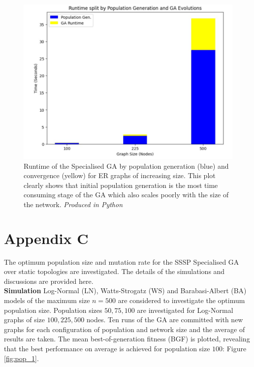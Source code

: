 \documentclass[
	a4paper, %
	10pt, %
	unnumberedsections, %
	twoside, %
]{LTJournalArticle}
\begin{document}
\begin{figure}[H]
	\includegraphics[width=\linewidth]{Figures/sssp/runtime.jpg}
	\caption{Runtime of the Specialised GA by population generation (blue) and convergence (yellow) for ER graphs of increasing size. This plot clearly shows that initial population generation is the most time consuming stage of the GA which also scales poorly with the size of the network. \emph{Produced in Python}}
	\label{fig:sssp_runtime}
\end{figure}

\chapter{Appendix C}
The optimum population size and mutation rate for the SSSP Specialised GA over static topologies are investigated. The details of the simulations and discussions are provided here. \\
 
 \textbf{Simulation} Log-Normal (LN), Watts-Strogatz (WS) and Barabasi-Albert (BA) models of the maximum size \(n = 500\) are considered to investigate the optimum population size. 
Population sizes \(50, 75, 100\) are investigated for Log-Normal graphs of size \(100, 225, 500\) nodes. Ten runs of the GA are committed with new graphs for each configuration of population and network size and the average of results are taken. The mean best-of-generation fitness (BGF) is plotted, revealing that the best performance on average is achieved for population size \(100\): Figure \ref{fig:pop_1}. \\
\end{document}
